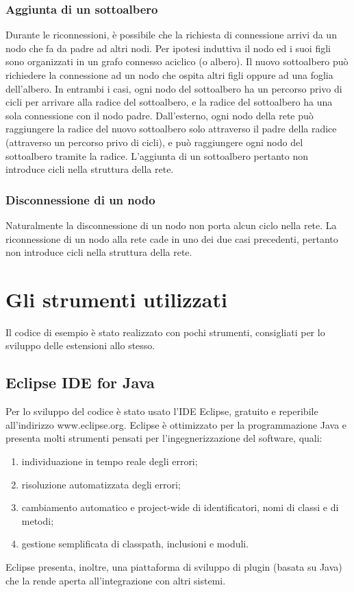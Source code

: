 \documentclass[10pt]{article} %
\begin{document}
\subsubsection{Aggiunta di un sottoalbero}
Durante le riconnessioni, è possibile che la richiesta di connessione arrivi da un nodo che fa da padre ad altri nodi. Per ipotesi induttiva il nodo ed i suoi figli sono organizzati in un grafo connesso aciclico (o albero). Il nuovo sottoalbero può richiedere la connessione ad un nodo che ospita altri figli oppure ad una foglia dell'albero. In entrambi i casi, ogni nodo del sottoalbero ha un percorso privo di cicli per arrivare alla radice del sottoalbero, e la radice del sottoalbero ha una sola connessione con il nodo padre. Dall'esterno, ogni nodo della rete può raggiungere la radice del nuovo sottoalbero solo attraverso il padre della radice (attraverso un percorso privo di cicli), e può raggiungere ogni nodo del sottoalbero tramite la radice. L'aggiunta di un sottoalbero pertanto non introduce cicli nella struttura della rete.
\subsubsection{Disconnessione di un nodo}
Naturalmente la disconnessione di un nodo non porta alcun ciclo nella rete. La riconnessione di un nodo alla rete cade in uno dei due casi precedenti, pertanto non introduce cicli nella struttura della rete.

\section{Gli strumenti utilizzati}
Il codice di esempio è stato realizzato con pochi strumenti, consigliati per lo sviluppo delle estensioni allo stesso.
\subsection{Eclipse IDE for Java}
Per lo sviluppo del codice è stato usato l'IDE Eclipse, gratuito e reperibile all'indirizzo www.eclipse.org. Eclipse è ottimizzato per la programmazione Java e presenta molti strumenti pensati per l'ingegnerizzazione del software, quali:
\begin{enumerate}
	\item individuazione in tempo reale degli errori;
	\item risoluzione automatizzata degli errori;
	\item cambiamento automatico e project-wide di identificatori, nomi di classi e di metodi;
	\item gestione semplificata di classpath, inclusioni e moduli.
\end{enumerate}
Eclipse presenta, inoltre, una piattaforma di sviluppo di plugin (basata su Java) che la rende aperta all'integrazione con altri sistemi.
\end{document}
